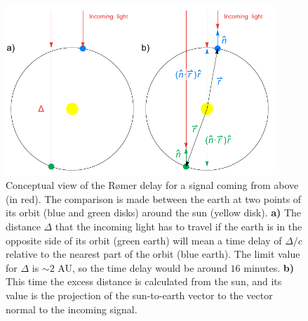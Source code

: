 
\begin{figure}
	\centering
	\includegraphics[width=0.9\textwidth]{img/Heliocentric.pdf}
	\caption[Conceptual view of the R\o{}mer delay]{ Conceptual view of the R\o{}mer delay for a signal coming from above (in red). 
	The comparison is made between the earth at two points of its orbit (blue and green disks) around the sun (yellow disk).
	\textbf{a)} The distance $\Delta$ that the incoming light has to travel if the earth is in the opposite side of its orbit (green earth) will mean a time delay of $\Delta/c$
	relative to the nearest part of the orbit (blue earth).
	The limit value for $\Delta$ is $\sim2$ AU, so the time delay would be around $16$ minutes.
	\textbf{b)} This time the excess distance is calculated from the sun, and its value is the projection of the sun-to-earth vector to the vector normal to the incoming signal.
	}
	\label{fig:romer-delay}
\end{figure}


